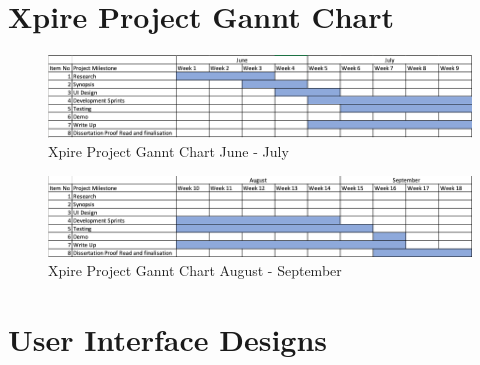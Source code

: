 \documentclass[a4paper,11pt]{report}
\begin{document}
\newpage
{}
\begin{appendix}
    \chapter{Xpire Project Gannt Chart}\label{app:ganntchart}
    \begin{figure}[ht]
    \centering
    \includegraphics[scale=1.0]{./assets/images/gannt1.png}
    {\caption*{Xpire Project Gannt Chart June - July}}
    \end{figure}
    \begin{figure}[ht]
    \centering
    \includegraphics[scale=1.0]{./assets/images/gannt2.png}
    {\caption*{Xpire Project Gannt Chart August - September}}
    \end{figure}
    \chapter{User Interface Designs}

\end{appendix}
\end{document}
